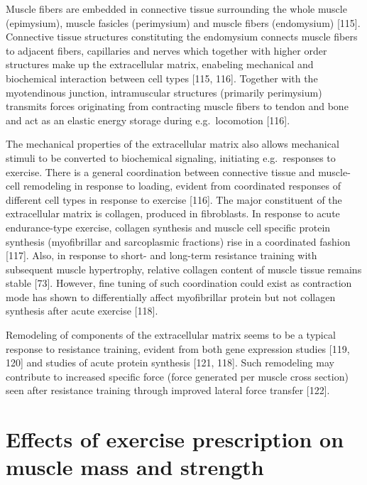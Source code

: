 \documentclass[twoside,10pt]{gihclass} %
\begin{document}
Muscle fibers are embedded in connective tissue surrounding the whole muscle (epimysium), muscle fasicles (perimysium) and muscle fibers (endomysium)
{[}115{]}.
Connective tissue structures constituting the endomysium connects muscle fibers to adjacent fibers, capillaries and nerves which together with higher order structures make up the extracellular matrix, enabeling mechanical and biochemical interaction between cell types
{[}115, 116{]}.
Together with the myotendinous junction, intramuscular structures (primarily perimysium) transmits forces originating from contracting muscle fibers to tendon and bone and act as an elastic energy storage during e.g.~locomotion
{[}116{]}.

The mechanical properties of the extracellular matrix also allows mechanical stimuli to be converted to biochemical signaling, initiating e.g.~responses to exercise.
There is a general coordination between connective tissue and muscle-cell remodeling in response to loading, evident from coordinated responses of different cell types in response to exercise
{[}116{]}.
The major constituent of the extracellular matrix is collagen, produced in fibroblasts.
In response to acute endurance-type exercise, collagen synthesis and muscle cell specific protein synthesis (myofibrillar and sarcoplasmic fractions) rise in a coordinated fashion
{[}117{]}.
Also, in response to short- and long-term resistance training with subsequent muscle hypertrophy, relative collagen content of muscle tissue remains stable
{[}73{]}.
However, fine tuning of such coordination could exist as contraction mode has shown to differentially affect myofibrillar protein but not collagen synthesis after acute exercise
{[}118{]}.

Remodeling of components of the extracellular matrix seems to be a typical response to resistance training, evident from both gene expression studies
{[}119, 120{]}
and studies of acute protein synthesis
{[}121, 118{]}.
Such remodeling may contribute to increased specific force (force generated per muscle cross section) seen after resistance training through improved lateral force transfer
{[}122{]}.

\hypertarget{effects-of-exercise-prescription-on-muscle-mass-and-strength}{%
\section{Effects of exercise prescription on muscle mass and strength}\label{effects-of-exercise-prescription-on-muscle-mass-and-strength}}
\end{document}
